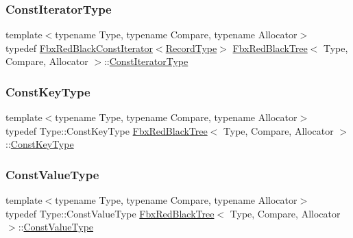 \mbox{\label{class_fbx_red_black_tree_a7309ae5e1bb24e7e3da94fef975d10c4}} 
\subsubsection{\texorpdfstring{Const\+Iterator\+Type}{ConstIteratorType}}
{\footnotesize\ttfamily template$<$typename Type, typename Compare, typename Allocator$>$ \\
typedef \hyperlink{class_fbx_red_black_const_iterator}{Fbx\+Red\+Black\+Const\+Iterator}$<$\hyperlink{class_fbx_red_black_tree_1_1_record_type}{Record\+Type}$>$ \hyperlink{class_fbx_red_black_tree}{Fbx\+Red\+Black\+Tree}$<$ Type, Compare, Allocator $>$\+::\hyperlink{class_fbx_red_black_tree_a7309ae5e1bb24e7e3da94fef975d10c4}{Const\+Iterator\+Type}}

\mbox{\label{class_fbx_red_black_tree_ad0aa82c0fd952b04edb550fc1fb36a32}} 
\subsubsection{\texorpdfstring{Const\+Key\+Type}{ConstKeyType}}
{\footnotesize\ttfamily template$<$typename Type, typename Compare, typename Allocator$>$ \\
typedef Type\+::\+Const\+Key\+Type \hyperlink{class_fbx_red_black_tree}{Fbx\+Red\+Black\+Tree}$<$ Type, Compare, Allocator $>$\+::\hyperlink{class_fbx_red_black_tree_ad0aa82c0fd952b04edb550fc1fb36a32}{Const\+Key\+Type}}

\mbox{\label{class_fbx_red_black_tree_a60ce913af196ee4cf886585363c4b0ca}} 
\subsubsection{\texorpdfstring{Const\+Value\+Type}{ConstValueType}}
{\footnotesize\ttfamily template$<$typename Type, typename Compare, typename Allocator$>$ \\
typedef Type\+::\+Const\+Value\+Type \hyperlink{class_fbx_red_black_tree}{Fbx\+Red\+Black\+Tree}$<$ Type, Compare, Allocator $>$\+::\hyperlink{class_fbx_red_black_tree_a60ce913af196ee4cf886585363c4b0ca}{Const\+Value\+Type}}

